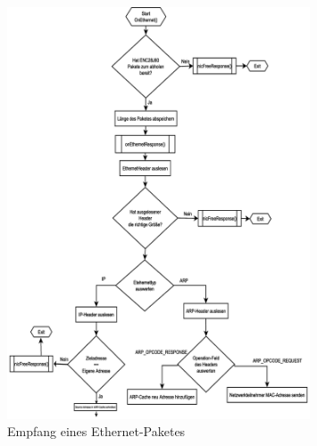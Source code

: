 \documentclass[a4paper]{book}%
\begin{document}
\begin{figure}[H]
	\centering
	\includegraphics[width=0.8\textwidth]{figures/ethernetto232-dia-01.eps}
	\caption[Empfang eines Ethernet-Paketes]{Empfang eines Ethernet-Paketes}
	\label{fig:ethernettors232 part1}
\end{figure}
\end{document}
